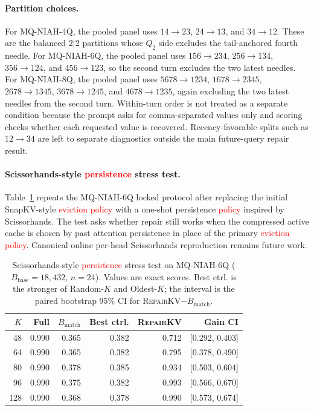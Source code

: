 \documentclass{article}
\newcommand{\repairkv}{\textsc{RepairKV}}
\newcommand{\bbase}{\ensuremath{B_{\mathrm{base}}}}
\newcommand{\bmatch}{\ensuremath{B_{\mathrm{match}}}}
\begin{document}
\paragraph{Partition choices.}
For MQ-NIAH-4Q, the pooled panel uses
$14{\rightarrow}23$, $24{\rightarrow}13$, and
$34{\rightarrow}12$.
These are the balanced $2|2$ partitions whose $Q_2$ side excludes the
tail-anchored fourth needle.
For MQ-NIAH-6Q, the pooled panel uses
$156{\rightarrow}234$, $256{\rightarrow}134$,
$356{\rightarrow}124$, and $456{\rightarrow}123$, so the second turn
excludes the two latest needles.
For MQ-NIAH-8Q, the pooled panel uses
$5678{\rightarrow}1234$, $1678{\rightarrow}2345$,
$2678{\rightarrow}1345$, $3678{\rightarrow}1245$, and
$4678{\rightarrow}1235$, again excluding the two latest needles from the
second turn.
Within-turn order is not treated as a separate condition because the
prompt asks for comma-separated values only and scoring checks whether
each requested value is recovered.
Recency-favorable splits such as $12{\rightarrow}34$ are left to
separate diagnostics outside the main future-query repair result.

\paragraph{Scissorhands-style \textcolor{red}{persistence} stress test.}
Table~\ref{tab:app-scissorhands-stress} repeats the MQ-NIAH-6Q locked
protocol after replacing the initial SnapKV-style \textcolor{red}{eviction policy} with a
one-shot persistence \textcolor{red}{policy} inspired by Scissorhands.
The test asks whether repair still works when the compressed active cache
is chosen by past attention persistence in place of the primary \textcolor{red}{eviction
policy}.
Canonical online per-head Scissorhands reproduction remains future work.

\begin{table}[H]
  \centering
  \caption{Scissorhands-style \textcolor{red}{persistence} stress test on
  MQ-NIAH-6Q ($\bbase{=}18{,}432$, $n{=}24$). Values are exact scores. Best
  ctrl. is the stronger of Random-$K$ and Oldest-$K$; the interval is the
  paired bootstrap $95\%$ CI for \repairkv{}$-\bmatch$.}
  \label{tab:app-scissorhands-stress}
  \small
  \begin{tabular}{rrrrrr}
    \toprule
    $K$ & Full & $\bmatch$ & Best ctrl. & \repairkv{} & Gain CI \\
    \midrule
    48 & 0.990 & 0.365 & 0.382 & 0.712 & [0.292, 0.403] \\
    64 & 0.990 & 0.365 & 0.382 & 0.795 & [0.378, 0.490] \\
    80 & 0.990 & 0.378 & 0.385 & 0.934 & [0.503, 0.604] \\
    96 & 0.990 & 0.375 & 0.382 & 0.993 & [0.566, 0.670] \\
    128 & 0.990 & 0.368 & 0.378 & 0.990 & [0.573, 0.674] \\
    \bottomrule
  \end{tabular}
\end{table}
\end{document}
